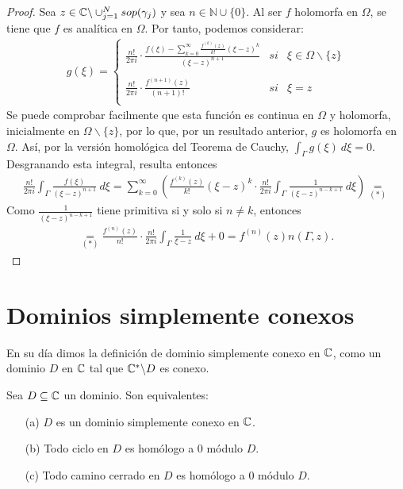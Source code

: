 \begin{proof}
    Sea $z \in \mathbb{C} \backslash \cup_{j=1}^{N} sop(\gamma_j)$ y sea $n \in \mathbb{N} \cup \{0\}$. Al ser $f$ holomorfa en $\Omega$, se tiene que $f$ es analítica en $\Omega$. Por tanto, podemos considerar:
    \begin{align*}
        g(\xi) = \left\{ \begin{array}{lcc}
                             \frac{n!}{2\pi i} \cdot \frac{f(\xi) - \sum_{k=0}^{\infty} \frac{f^{(k)}(z)}{k!}(\xi - z)^k}{(\xi - z)^{n+1}} & si & \xi \in \Omega \backslash \{z\} \\
                             \\ \frac{n!}{2\pi i} \cdot \frac{f^{(n+1)}(z)}{(n+1)!} &  si & \xi = z \\
                         \end{array}
        \right.
    \end{align*}
    Se puede comprobar facilmente que esta función es continua en $\Omega$ y holomorfa, inicialmente en $\Omega \backslash \{z\}$, por lo que, por un resultado anterior, $g$ es holomorfa en $\Omega$. Así, por la versión homológica del Teorema de Cauchy, $\int_{\Gamma} g(\xi) \ d\xi = 0$. Desgranando esta integral, resulta entonces
    \begin{align*}
        \frac{n!}{2\pi i} \int_{\Gamma} \frac{f(\xi)}{(\xi -z)^{n+1}} \ d\xi = \sum_{k=0}^{\infty} \left( \frac{f^{(k)}(z)}{k!}(\xi - z)^k \cdot \frac{n!}{2\pi i} \int_{\Gamma} \frac{1}{(\xi - z)^{n-k+1}} \ d\xi \right) \underset{(*)}{=}
    \end{align*}
    Como $\frac{1}{(\xi - z)^{n-k+1}}$ tiene primitiva si y solo si $n \not = k$, entonces
    \begin{align*}
        \underset{(*)}{=} \frac{f^{(n)}(z)}{n!} \cdot \frac{n!}{2\pi i} \int_{\Gamma} \frac{1}{\xi -z} \ d\xi + 0 = f^{(n)}(z)n(\Gamma,z).
    \end{align*}
\end{proof}

\section{Dominios simplemente conexos}
En su día dimos la definición de dominio simplemente conexo en $\mathbb{C}$, como un dominio $D$ en $\mathbb{C}$ tal que $\mathbb{C}^* \backslash D$ es conexo.

\begin{teo}
    Sea $D \subseteq \mathbb{C}$ un dominio. Son equivalentes:
    \begin{enumerate}
        \item[(a)] $D$ es un dominio simplemente conexo en $\mathbb{C}$.
        \item[(b)] Todo ciclo en $D$ es homólogo a 0 módulo $D$.
        \item[(c)] Todo camino cerrado en $D$ es homólogo a 0 módulo $D$.
    \end{enumerate}
\end{teo}

